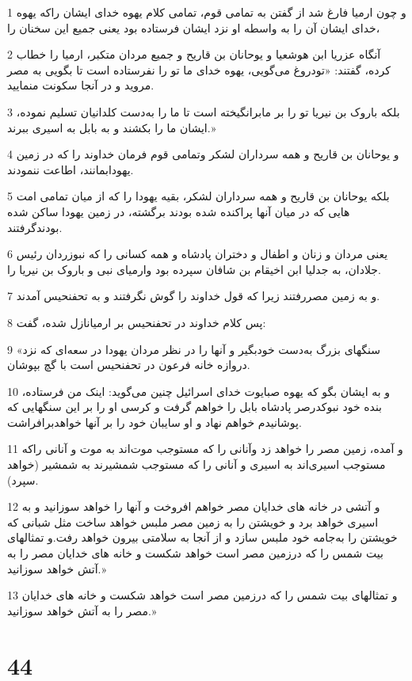 \par 1 و چون ارمیا فارغ شد از گفتن به تمامی قوم، تمامی کلام یهوه خدای ایشان راکه یهوه خدای ایشان آن را به واسطه او نزد ایشان فرستاده بود یعنی جمیع این سخنان را،
\par 2 آنگاه عزریا ابن هوشعیا و یوحانان بن قاریح و جمیع مردان متکبر، ارمیا را خطاب کرده، گفتند: «تودروغ می‌گویی، یهوه خدای ما تو را نفرستاده است تا بگویی به مصر مروید و در آنجا سکونت منمایید.
\par 3 بلکه باروک بن نیریا تو را بر مابرانگیخته است تا ما را به‌دست کلدانیان تسلیم نموده، ایشان ما را بکشند و به بابل به اسیری ببرند.»
\par 4 و یوحانان بن قاریح و همه سرداران لشکر وتمامی قوم فرمان خداوند را که در زمین یهودابمانند، اطاعت ننمودند.
\par 5 بلکه یوحانان بن قاریح و همه سرداران لشکر، بقیه یهودا را که از میان تمامی امت هایی که در میان آنها پراکنده شده بودند برگشته، در زمین یهودا ساکن شده بودندگرفتند.
\par 6 یعنی مردان و زنان و اطفال و دختران پادشاه و همه کسانی را که نبوزردان رئیس جلادان، به جدلیا ابن اخیقام بن شافان سپرده بود وارمیای نبی و باروک بن نیریا را.
\par 7 و به زمین مصررفتند زیرا که قول خداوند را گوش نگرفتند و به تحفنحیس آمدند.
\par 8 پس کلام خداوند در تحفنحیس بر ارمیانازل شده، گفت:
\par 9 «سنگهای بزرگ به‌دست خودبگیر و آنها را در نظر مردان یهودا در سعه‌ای که نزد دروازه خانه فرعون در تحفنحیس است با گچ بپوشان.
\par 10 و به ایشان بگو که یهوه صبایوت خدای اسرائیل چنین می‌گوید: اینک من فرستاده، بنده خود نبوکدرصر پادشاه بابل را خواهم گرفت و کرسی او را بر این سنگهایی که پوشانیدم خواهم نهاد و او سایبان خود را بر آنها خواهدبرافراشت.
\par 11 و آمده، زمین مصر را خواهد زد وآنانی را که مستوجب موت‌اند به موت و آنانی راکه مستوجب اسیری‌اند به اسیری و آنانی را که مستوجب شمشیرند به شمشیر (خواهد سپرد).
\par 12 و آتشی در خانه های خدایان مصر خواهم افروخت و آنها را خواهد سوزانید و به اسیری خواهد برد و خویشتن را به زمین مصر ملبس خواهد ساخت مثل شبانی که خویشتن را به‌جامه خود ملبس سازد و از آنجا به سلامتی بیرون خواهد رفت.و تمثالهای بیت شمس را که درزمین مصر است خواهد شکست و خانه های خدایان مصر را به آتش خواهد سوزانید.»
\par 13 و تمثالهای بیت شمس را که درزمین مصر است خواهد شکست و خانه های خدایان مصر را به آتش خواهد سوزانید.»
 
\chapter{44}

